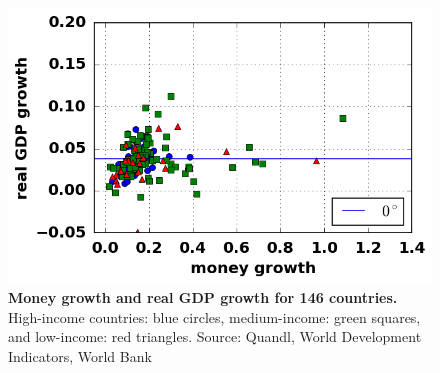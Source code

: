 \begin{figure}[h]
\caption{\label{fig_inflationGDPOpen} \textbf{Money growth and real GDP growth for 146 countries.} High-income countries: blue circles, medium-income: green squares, and low-income: red triangles. {\tiny Source: Quandl, World Development Indicators, World Bank}}
\hspace*{-.5cm}\includegraphics[height = 7.cm]{./png/fig_moneyGDPOpen.png}
\end{figure}